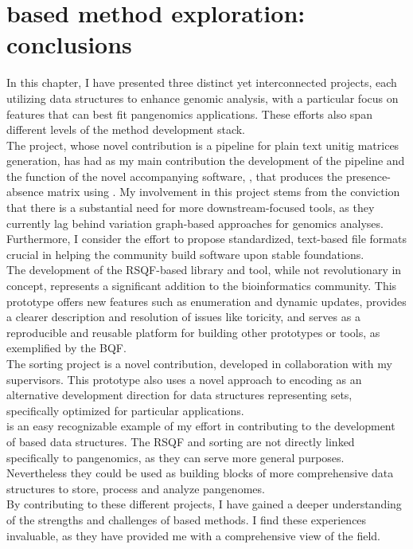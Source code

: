 \section{\kmer based method exploration: conclusions}
In this chapter, I have presented three distinct yet interconnected projects, each utilizing \kmer data structures to enhance genomic analysis, with a particular focus on features that can best fit pangenomics applications. These efforts also span different levels of the method development stack.\\
The \muset project, whose novel contribution is a pipeline for plain text unitig matrices generation, has had as my main contribution the development of the pipeline and the function of the novel accompanying software, \kmat, that produces the presence-absence matrix using \ggcat. My involvement in this project stems from the conviction that there is a substantial need for more downstream-focused \kmer tools, as they currently lag behind variation graph-based approaches for genomics analyses. Furthermore, I consider the effort to propose standardized, text-based file formats crucial in helping the community build software upon stable foundations.\\
The development of the RSQF-based library and tool, while not revolutionary in concept, represents a significant addition to the bioinformatics community. This prototype offers new features such as enumeration and dynamic updates, provides a clearer description and resolution of issues like toricity, and serves as a reproducible and reusable platform for building other prototypes or tools, as exemplified by the BQF.\\
The \skmer sorting project is a novel contribution, developed in collaboration with my supervisors. This prototype also uses a novel approach to encoding \skmers as an alternative development direction for data structures representing \kmer sets, specifically optimized for particular applications.\\
\muset is an easy recognizable example of my effort in contributing to the development of \kmer based data structures. The RSQF and \skmer sorting are not directly linked specifically to pangenomics, as they can serve more general purposes. Nevertheless they could be used as building blocks of more comprehensive data structures to store, process and analyze pangenomes.\\
By contributing to these different projects, I have gained a deeper understanding of the strengths and challenges of \kmer based methods. I find these experiences invaluable, as they have provided me with a comprehensive view of the field.

\printbibliography